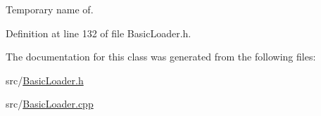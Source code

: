 Temporary name of. 



Definition at line 132 of file Basic\-Loader.\-h.



The documentation for this class was generated from the following files\-:\begin{DoxyCompactItemize}
\item 
src/\hyperlink{_basic_loader_8h}{Basic\-Loader.\-h}\item 
src/\hyperlink{_basic_loader_8cpp}{Basic\-Loader.\-cpp}\end{DoxyCompactItemize}
